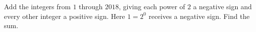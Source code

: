 Add the integers from $1$ through $2018$, giving each power of $2$ a negative sign and every other integer a positive sign. Here $1=2^0$ receives a negative sign. Find the sum.
